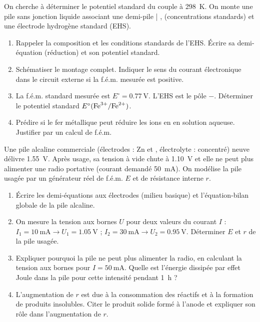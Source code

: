 \documentclass[11pt]{article}
\begin{document}
\begin{exercice}
On cherche à déterminer le potentiel standard du couple  à \SI{298}{\kelvin}. On monte une pile sans jonction liquide associant une demi-pile | ,  (concentrations standards) et une électrode hydrogène standard (EHS).
\begin{enumerate}
    \item Rappeler la composition et les conditions standards de l'EHS. Écrire sa demi-équation (réduction) et son potentiel standard.
    \item Schématiser le montage complet. Indiquer le sens du courant électronique dans le circuit externe si la f.é.m. mesurée est positive.
    \item La f.é.m. standard mesurée est $E^\circ = \SI{0,77}{\volt}$. L'EHS est le pôle $-$. Déterminer le potentiel standard $E^\circ(\ce{Fe^{3+}/Fe^{2+}})$.
    \item Prédire si le fer métallique peut réduire les ions  en  en solution aqueuse. Justifier par un calcul de f.é.m.
\end{enumerate}
\end{exercice}

\begin{exercice}
Une pile alcaline commerciale (électrodes : Zn et , électrolyte :  concentré) neuve délivre \SI{1,55}{\volt}. Après usage, sa tension à vide chute à \SI{1,10}{\volt} et elle ne peut plus alimenter une radio portative (courant demandé \SI{50}{\milli\ampere}). On modélise la pile usagée par un générateur réel de f.é.m. $E$ et de résistance interne $r$.
\begin{enumerate}
    \item Écrire les demi-équations aux électrodes (milieu basique) et l'équation-bilan globale de la pile alcaline.
    \item On mesure la tension aux bornes $U$ pour deux valeurs du courant $I$ : $I_1 = \SI{10}{\milli\ampere} \rightarrow U_1 = \SI{1,05}{\volt}$ ; $I_2 = \SI{30}{\milli\ampere} \rightarrow U_2 = \SI{0,95}{\volt}$. Déterminer $E$ et $r$ de la pile usagée.
    \item Expliquer pourquoi la pile ne peut plus alimenter la radio, en calculant la tension aux bornes pour $I = \SI{50}{\milli\ampere}$. Quelle est l'énergie dissipée par effet Joule dans la pile pour cette intensité pendant \SI{1}{\hour} ?
    \item L'augmentation de $r$ est due à la consommation des réactifs et à la formation de produits insolubles. Citer le produit solide formé à l'anode et expliquer son rôle dans l'augmentation de $r$.
\end{enumerate}
\end{exercice}
\end{document}
